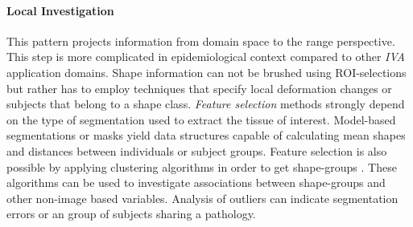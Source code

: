 \documentclass[journal]{style/vgtc} 			          %
\begin{document}
\paragraph{Local Investigation}
This pattern projects information from domain space to the range perspective.
%
This step is more complicated in epidemiological context compared to other \emph{IVA} application domains.
%
Shape information can not be brushed using ROI-selections but rather has to employ techniques that specify local deformation changes \cite{Hermann2014} or subjects that belong to a shape class.
%
\emph{Feature selection} methods strongly depend on the type of segmentation used to extract the tissue of interest.
%
Model-based segmentations or masks yield data structures capable of calculating mean shapes and distances between individuals or subject groups.
%
Feature selection is also possible by applying clustering algorithms in order to get shape-groups \cite{Klemm2013VMV}.
%
These algorithms can be used to investigate associations between shape-groups and other non-image based variables.
%
Analysis of outliers can indicate segmentation errors or an group of subjects sharing a pathology.
%
%



\end{document}
